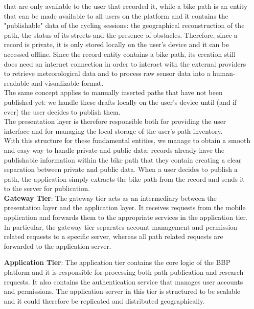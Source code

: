 that are only available to the user that recorded it, while a bike path is an entity that can be made available to all users on the platform and it contains the "publishable" data of the cycling sessions: the geographical reconstruction of the path, the status of its streets and the presence of obstacles.
Therefore, since a record is private, it is only stored locally on the user's device and it can be accessed offline. Since the record entity contains a bike path, its creation still does need an internet connection in order to interact with the external providers to retrieve meteorological data and to process raw sensor data into a human-readable and visualizable format.\\

The same concept applies to manually inserted paths that have not been published yet: we handle these drafts locally on the user's device until (and if ever) the user decides to publish them. \\
The presentation layer is therefore responsible both for providing the user interface and for managing the local storage of the user's path inventory.\\

With this structure for these fundamental entities, we manage to obtain a smooth and easy way to handle private and public data: records already have the publishable information within the bike path that they contain creating a clear separation between private and public data. When a user decides to publish a path, the application simply extracts the bike path from the record and sends it to the server for publication.\\ 

\vspace{0.5cm}
\noindent \textbf{Gateway Tier}: The gateway tier acts as an intermediary between the presentation layer and the application layer. It receives requests from the mobile application and forwards them to the appropriate services in the application tier.
In particular, the gateway tier separates account management and permission related requests to a specific server, whereas all path related requests are forwarded to the application server.

\vspace{0.5cm}
\noindent \textbf{Application Tier}: The application tier contains the core logic of the BBP platform and it is responsible for processing both path publication and research requests. It also contains the authentication service that manages user accounts and permissions.
The application server in this tier is structured to be scalable and it could therefore be replicated and distributed geographically.

